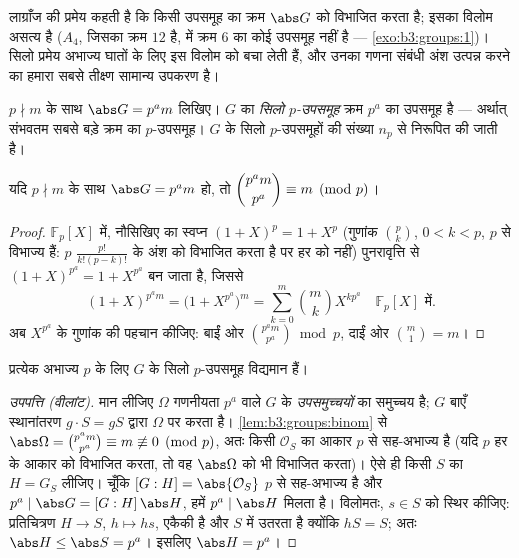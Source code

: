 लाग्राँज की प्रमेय कहती है कि किसी उपसमूह का क्रम $\abs G$ को
विभाजित करता है; इसका विलोम असत्य है ($A_4$, जिसका क्रम $12$
है, में क्रम $6$ का कोई उपसमूह नहीं है --- \cref{exo:b3:groups:1})। सिलो प्रमेय
अभाज्य घातों के लिए इस विलोम को बचा लेती हैं, और उनका गणना संबंधी
अंश  उत्पन्न करने का हमारा सबसे तीक्ष्ण सामान्य
उपकरण है।

\begin{definition}\label{def:b3:groups:sylow}
$p \nmid m$ के साथ $\abs G = p^a m$ लिखिए। $G$ का \emph{सिलो
$p$-उपसमूह} क्रम $p^a$ का उपसमूह है ---
अर्थात् संभवतम सबसे बड़े क्रम का $p$-उपसमूह। $G$ के सिलो
$p$-उपसमूहों की संख्या $n_p$ से निरूपित की जाती है।
\end{definition}

\begin{lemma}\label{lem:b3:groups:binom}
यदि $p \nmid m$ के साथ $\abs G = p^a m$ हो, तो $\dbinom{p^a m}{p^a}
\equiv m \pmod p$।
\end{lemma}

\begin{proof}
$\mathbb F_p[X]$ में, नौसिखिए का स्वप्न $(1+X)^p = 1 + X^p$ (गुणांक $\binom pk$, $0<k<p$, $p$
से विभाज्य हैं: $p$ $\frac{p!}{k!(p-k)!}$ के अंश को विभाजित करता है पर हर को
नहीं) पुनरावृत्ति से $(1+X)^{p^a} = 1 + X^{p^a}$ बन जाता है, जिससे
\[
(1+X)^{p^a m} = \bigl(1 + X^{p^a}\bigr)^m
= \sum_{k=0}^{m} \binom mk X^{k p^a} \quad \mathbb
F_p[X] \text{ में}.
\]
अब $X^{p^a}$ के गुणांक की पहचान कीजिए: बाईं ओर $\binom{p^a
m}{p^a} \bmod p$, दाईं ओर $\binom m1 = m$।
\end{proof}

\begin{theorem}[सिलो I: अस्तित्व]\label{thm:b3:groups:sylow1}
प्रत्येक अभाज्य $p$ के लिए $G$ के सिलो $p$-उपसमूह विद्यमान
हैं।
\end{theorem}

\begin{proof}[उपपत्ति (वीलांट)]
मान लीजिए $\Omega$ गणनीयता $p^a$ वाले $G$ के \emph{उपसमुच्चयों}
का समुच्चय है; $G$ बाएँ स्थानांतरण $g \cdot S = gS$ द्वारा $\Omega$ पर
 करता है। \cref{lem:b3:groups:binom} से $\abs\Omega = \binom{p^a m}{p^a}
\equiv m \not\equiv 0 \pmod p$, अतः किसी  $\mathcal O_S$ का आकार
$p$ से सह-अभाज्य है (यदि $p$ हर  के आकार को विभाजित
करता, तो वह $\abs\Omega$ को भी विभाजित करता)। ऐसे ही किसी $S$ का
 $H = G_S$ लीजिए। चूँकि $[G : H] = \abs{\mathcal O_S}$ $p$ से सह-अभाज्य है और
$p^a \mid
\abs G = [G:H]\,\abs H$, हमें $p^a \mid \abs H$ मिलता है। विलोमतः, $s \in S$ को स्थिर कीजिए:
प्रतिचित्रण $H \to S$, $h \mapsto hs$, एकैकी है और $S$ में उतरता है क्योंकि
$hS = S$; अतः $\abs H \leq \abs S = p^a$। इसलिए $\abs H = p^a$।
\end{proof}

